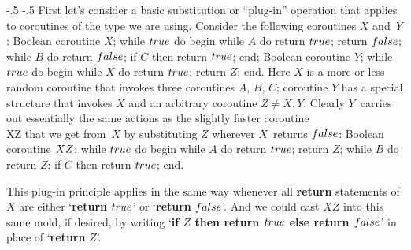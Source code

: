 \begingroup\advance\abovedisplayskip -.5\baselineskip %
           \advance\belowdisplayskip -.5\baselineskip %
First let's consider a basic substitution or ``plug-in'' operation
that applies to coroutines of the type we are using. Consider the
following coroutines $X$ and~$Y$:
\beginprogram
\quad Boolean coroutine $X$;\cr
\qquad while $\\{true}$ do begin\cr
\qquad\quad while $A$ do return $\\{true}$;\cr
\qquad\quad return $\\{false}$;\cr
\qquad\quad while $B$ do return $\\{false}$;\cr
\qquad\quad if $C$ then return $\\{true}$;\cr
\qquad\quad end;\cr
\noalign{\smallskip}
\quad Boolean coroutine $Y$;\cr
\qquad while $\\{true}$ do begin\cr
\qquad\quad while $X$ do return $\\{true}$;\cr
\qquad\quad return $Z$;\cr
\qquad\quad end\rm.\cr
\endprogram
Here $X$ is a more-or-less random coroutine that invokes three coroutines
$A$, $B$, $C$; coroutine $Y$ has a special structure that invokes $X$ and
an arbitrary coroutine $Z\ne X,Y$.  Clearly $Y$~carries out
essentially the same actions as the slightly faster
coroutine~\\{XZ} that we get from~$X$ by substituting $Z$
wherever $X$~returns $\\{false}$:
\beginprogram
\quad Boolean coroutine $\\{XZ}$;\cr
\qquad while $\\{true}$ do begin\cr
\qquad\quad while $A$ do return $\\{true}$;\cr
\qquad\quad return $Z$;\cr
\qquad\quad while $B$ do return $Z$;\cr
\qquad\quad if $C$ then return $\\{true}$;\cr
\qquad\quad end\rm.\cr
\endprogram

This plug-in principle applies in the same way whenever all {\bf
return} statements of $X$ are either 
`{\bf return} $\\{true}$' or `{\bf return} $\\{false}$'.
And we could cast $XZ$ into this same mold, if desired, by
writing `{\bf if $Z$ then return $\\{true}$ else return
$\\{false}$}' in place of `{\bf return} $Z$'.
\par\endgroup

